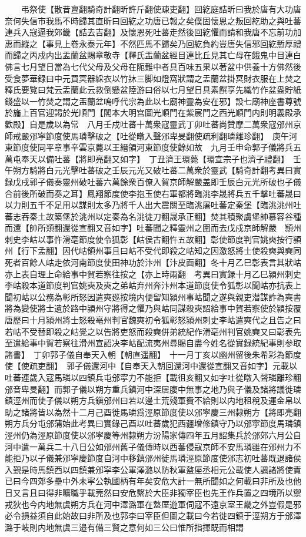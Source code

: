 　　弔祭使【散昔亶翻騎奇計翻昕許斤翻使疎吏翻】回紇庭詰昕曰我於唐有大功唐奈何失信市我馬不時歸其直昕曰回紇之功唐已報之矣僕固懷恩之叛回紇助之與吐蕃連兵入寇逼我郊畿【詰去吉翻】及懷恩死吐蕃走然後回紇懼而請和我唐不忘前功加惠而縱之【事見上卷永泰元年】不然匹馬不歸矣乃回紇負約豈唐失信邪回紇慙厚禮而歸之丙戍内出盂蘭盆賜章敬寺【釋氏㿻蘭盆經目連比丘見其亡母在餓鬼中目連白佛言七月望日當為七代父母及父母在阨難中者具百味五果以著盆中供養十方佛然後受食夢華録曰中元買冥器綵衣以竹牀三脚如燈窩狀謂之盂蘭盆掛冥財衣服在上焚之釋氏要覧曰梵云盂蘭此云救倒懸盆陸游曰俗以七月望日具素饌享先織竹作盆盎貯紙錢盛以一竹焚之謂之㿻蘭盆嗚呼代宗為此以七廟神靈為安在邪】設七廟神座書尊號於旛上百官迎謁於光順門【閣本大明宫圖光順門在紫宸門之西光順門内則明義殿承歡殿】自是歲以為常　八月壬戍吐蕃十萬衆寇靈武丁卯吐蕃尚贊摩二萬衆寇邠州京師戒嚴邠寜節度使馬璘擊破之【吐從暾入聲邠卑旻翻使疏利翻璘離珍翻】　庚午河東節度使同平章事辛雲京薨以王縉領河東節度使餘如故　九月壬申命郭子儀將兵五萬屯奉天以備吐蕃【將即亮翻又如字】　丁丑濟王環薨【環宣宗子也濟子禮翻】　壬午朔方騎將白元光擊吐蕃破之壬辰元光又破吐蕃二萬衆於靈武【騎奇計翻考異曰實録戊戌郭子儀奏靈州破吐蕃六萬餘衆百僚入賀京師解嚴盖即壬辰白元光所破也子儀合前後所破而奏之耳】鳳翔節度使李抱玉使右軍都將臨洮李晟將兵五千擊吐蕃晟曰以力則五千不足用以謀則太多乃將千人出大震關至臨洮屠吐蕃定秦堡【臨洮洮州吐蕃志吞秦土故築堡於洮州以定秦為名洮徒刀翻晟承正翻】焚其積聚虜堡帥慕容谷種而還【帥所類翻還從宣翻又音如字】吐蕃聞之釋靈州之圍而去戊戍京師解嚴　頴州刺史李岵以事忤滑亳節度使令狐彰【岵侯古翻忤五故翻】彰使節度判官姚奭按行頴州【行下孟翻】因代岵領州事且曰岵不受代即殺之岵知之因激怒將士使殺奭與奭同死者百餘人岵走依河南節度使田神功於汴州【汴皮面翻】冬十月乙巳彰表言其狀岵亦上表自理上命給事中賀若察往按之【亦上時兩翻　考異曰實録十月乙巳潁州刺史李岵殺本道節度判官姚奭及奭之弟岵弃州奔汴州本道節度使令狐彰以聞岵亦抗表上聞初岵以公務為彰所怒因遣奭廵按境内便留知潁州事岵聞之遂與親吏潜謀詐為奭書將為變使將士遺於路中潁州守將得之懼乃與岵同謀殺奭詔給事中賀若察使於潁按覆唐歷曰十月潁州將士怒殺亳州判官魏奭初令狐彰怒潁州刺史李岵遣奭代之且告之曰若岵不受替即殺之岵覺之以告將吏怒而殺奭併弟統紀作滑亳州判官姚奭又曰彰表先至遣給事中賀若察往滑州宣詔决李岵配流夷州尋賜自盡今姓名從實録統紀事則参取諸書】　丁卯郭子儀自奉天入朝【朝直遥翻】　十一月丁亥以幽州留後朱希彩為節度使【使疏吏翻】　郭子儀還河中【自奉天入朝回還河中還從宣翻又音如字】元載以吐蕃連歲入寇馬璘以四鎮兵屯邠寜力不能拒【載徂亥翻又如字吐從暾入聲璘離珍翻邠音卑旻翻】而郭子儀以朔方重兵鎮河中深居腹中無事之地乃與子儀及諸將議徙璘鎮涇州而使子儀以朔方兵鎭邠州曰若以邊土荒殘軍費不給則以内地租稅及運金帛以助之諸將皆以為然十二月己酉徙馬璘爲涇原節度使以邠寜慶三州隸朔方【將即亮翻朔方兵分屯邠蒲始此考異曰實錄己酉以吐蕃歲犯西疆增修鎮守乃以邠寜節度馬璘鎮涇州仍為涇原節度使以邠寜慶等州隸朔方汾陽家傳四年五月詔集兵於邠郊六月公自河中遣一萬兵二十八日公如邠州舊子儀傳時以西蕃侵寇京師不安馬璘雖在邠州力不能拒乃以子儀兼邠寜慶節度自河中移鎮邠州徙馬璘涇原節度使邠志初吐蕃既退諸侯入覲是時馬鎮西以四鎮兼邠寜李公軍澤潞以防秋軍盩厔丞相元公載使人諷諸將使責已曰今四郊多壘中外未寜公執國柄有年矣安危大計一無所聞如之何載曰非所及也他日又言且曰得非曠職乎載莞然曰安危繫於大臣非獨宰臣也先王作兵置之四境所以禦戎狄也今内地無虞朔方兵在河中澤潞軍在盩厔遊軍伺寇不遠京室王畿之外豈假是邪必令損益須自此始故曰非所及也郭李曰宰臣但圖之載曰今若徙四鎮于涇朔方于邠澤潞于岐則内地無虞三邉有備三賢之意何如三公曰惟所指揮既而相謂